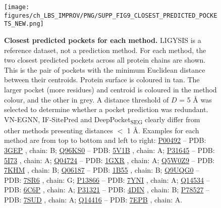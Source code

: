 \begin{figure}[ht!]
    \centering
    \texttt{[image: figures/ch\_LBS\_IMPROV/PNG/SUPP\_FIG9\_CLOSEST\_PREDICTED\_POCKETS\_NEW.png]}
    \caption[Closest predicted pockets for each methods]{\textbf{Closest predicted pockets for each method.} LIGYSIS is a reference dataset, not a prediction method. For each method, the two closest predicted pockets across all protein chains are shown. This is the pair of pockets with the minimum Euclidean distance between their centroids. Protein surface is coloured in tan. The larger pocket (more residues) and centroid is coloured in the method colour, and the other in grey. A distance threshold of $D$ = 5 \AA{} was selected to determine whether a pocket prediction was redundant. VN-EGNN, IF-SitePred and DeepPocket\textsubscript{SEG} clearly differ from other methods presenting distances $<$ 1 \AA{}. Examples for each method are from top to bottom and left to right: \href{https://www.uniprot.org/uniprotkb/P00492/entry}{P00492} -- PDB: \href{https://www.ebi.ac.uk/pdbe/entry/pdb/3gep}{3GEP} \cite{KEOUGH_2009_HYPOXAN}, chain: B; \href{https://www.uniprot.org/uniprotkb/Q96KS0/entry}{Q96KS0} -- PDB: \href{https://www.ebi.ac.uk/pdbe/entry/pdb/5v1b}{5V1B} \cite{AHMED_2017_HIF}, chain: A; \href{https://www.uniprot.org/uniprotkb/P31645/entry}{P31645} -- PDB: \href{https://www.ebi.ac.uk/pdbe/entry/pdb/5i73}{5I73} \cite{COLEMAN_2016_SEROTONIN}, chain: A; \href{https://www.uniprot.org/uniprotkb/Q04724/entry}{Q04724} -- PDB: \href{https://www.ebi.ac.uk/pdbe/entry/pdb/1gxr}{1GXR} \cite{PICKLES_2002_WD40}, chain: A; \href{https://www.uniprot.org/uniprotkb/Q5W0Z9/entry}{Q5W0Z9} -- PDB: \href{https://www.ebi.ac.uk/pdbe/entry/pdb/7khm}{7KHM} \cite{CHULJIN_2022_ACYLCOA}, chain: B; \href{https://www.uniprot.org/uniprotkb/Q06187/entry}{Q06187} -- PDB: \href{https://www.ebi.ac.uk/pdbe/entry/pdb/1b55}{1B55} \cite{BARALDI_1999_PH}, chain: B; \href{https://www.uniprot.org/uniprotkb/Q9UQG0/entry}{Q9UQG0} -- PDB: \href{https://www.ebi.ac.uk/pdbe/entry/pdb/7sr6}{7SR6} \cite{BALDWIN_2022_HERVK}, chain: G; \href{https://www.uniprot.org/uniprotkb/P13866/entry}{P13866} -- PDB: \href{https://www.ebi.ac.uk/pdbe/entry/pdb/7yni}{7YNI} \cite{CUI_2023_SGLT}, chain: A; \href{https://www.uniprot.org/uniprotkb/Q14534/entry}{Q14534} -- PDB: \href{https://www.ebi.ac.uk/pdbe/entry/pdb/6c6p}{6C6P} \cite{PADYANA_2019_EPOXIDASE}, chain: A; \href{https://www.uniprot.org/uniprotkb/P31321/entry}{P31321} -- PDB: \href{https://www.ebi.ac.uk/pdbe/entry/pdb/4din}{4DIN} \cite{ILOUZ_2012_PKA}, chain: B; \href{https://www.uniprot.org/uniprotkb/P78527/entry}{P78527} -- PDB: \href{https://www.ebi.ac.uk/pdbe/entry/pdb/7sud}{7SUD} \cite{LIU_2022_DNAPK}, chain: A; \href{https://www.uniprot.org/uniprotkb/Q14416/entry}{Q14416} -- PDB: \href{https://www.ebi.ac.uk/pdbe/entry/pdb/7epb}{7EPB} \cite{DU_2021_MGLU7}, chain: A.}
    \label{fig:closest_pred_pockets}
\end{figure}

